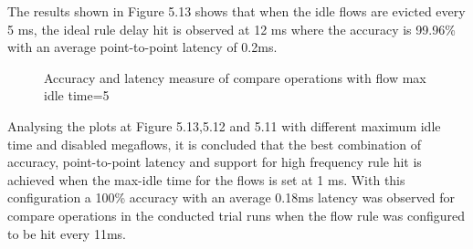 The results shown in Figure 5.13 shows that when the idle flows are evicted every 5 ms, the ideal rule delay hit is observed at 12 ms where the accuracy is 99.96\% with an average point-to-point latency of 0.2ms.

\begin{figure}[H]		
	
	\caption{Accuracy and latency measure of compare operations with flow max idle time=5}
	\hfil{}
\end{figure}

Analysing the plots at Figure 5.13,5.12 and 5.11 with different maximum idle time and disabled megaflows, it is concluded that the best combination of accuracy, point-to-point latency and support for high frequency rule hit is achieved when the max-idle time for the flows is set at 1 ms. With this configuration a 100\% accuracy with an average 0.18ms latency was observed for compare operations in the conducted trial runs when the flow rule was configured to be hit every 11ms.

%

